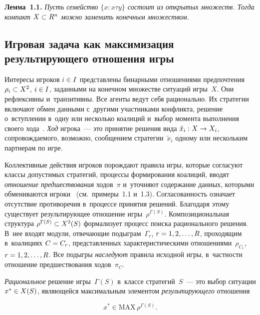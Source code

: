\begin{multicols}{2}
    \smallskip
    
    \noindent
    \textbf{Лемма~1.1.} \textit{Пусть семейство $\{ x: x\tau y\}$ со\-сто\-ит из 
открытых множеств. Тогда компакт $X\hm\subset R^n$ можно заменить 
конечным множеством.}
     
  \subsection*{Игровая задача как максимизация результирующего 
отношения игры}
   
    Интересы игроков $i\hm\in I$ пред\-став\-ле\-ны бинарными отношениями 
предпочтения $\rho_i\hm\subset X^2$, $i\hm\in I$, заданными на конечном 
множестве ситуаций игры~$X$. Они реф\-лек\-сив\-ны и~тран\-зи\-тив\-ны. Все агенты ведут 
себя рационально. Их стратегии включают обмен данными с~другими участниками 
конфликта, решение о~вступ\-ле\-нии в~одну или несколько коалиций и~выбор момента 
выполнения своего хода~\cite{1-vas, 5-vas}. \textit{Ход} игрока~--- это принятие 
решения вида $\tilde{x}_i : X\hm\to X_i$, со\-про\-вож\-да\-емо\-го, воз\-мож\-но, сообщением 
стратегии~$\tilde{x}_i$ одному или нескольким парт\-не\-рам по игре. 
    
    Коллективные действия игроков порождают правила игры, которые согласуют 
классы до\-пус\-ти\-мых стратегий, процессы формирования коалиций, вводят 
\textit{отношение предшествования} ходов~$\pi$ и~уточ\-ня\-ют содержание данных, 
которыми обмениваются игроки~\cite{5-vas} (см.\ примеры~1.1 и~1.3). 
Со\-гла\-со\-ван\-ность означает отсутствие противоречия в~процессе принятия решений. 
Благодаря этому существует ре\-зуль\-ти\-ру\-ющее отношение игры~$\rho^{\Gamma(S)}$. 
Композициональная структура $\rho^{\Gamma(S)} \hm\subset X^2(S)$ формализует 
процесс поиска рационального решения. В~нее входят модули, от\-ве\-ча\-ющие 
подыграм~$\Gamma_r$, $r\hm= 1,2, \ldots , R$, проходящим в~коалициях $C\hm= 
C_r$, пред\-став\-лен\-ных характеристическими отношениями~$\rho_{C_r}$, $r\hm= 
1,2,\ldots , R$. Все подыгры \textit{на\-сле\-ду\-ют} правила исходной игры, в~част\-ности 
отношение пред\-шест\-во\-ва\-ния ходов~$\pi_C$.
    
    \textit{Рациональное} решение игры~$\Gamma(S)$ в~классе стратегий~$S$~--- 
это выбор ситуации $x^*\hm\in X(S)$, яв\-ля\-ющей\-ся мак\-си\-маль\-ным элементом 
\textit{ре\-зуль\-ти\-ру\-юще\-го} отношения

\noindent
    \begin{equation}
    x^* \in \mathrm{MAX}\,\rho^{\Gamma(S)}.
    \label{e1.5-vas}
    \end{equation}
    

\end{multicols}
